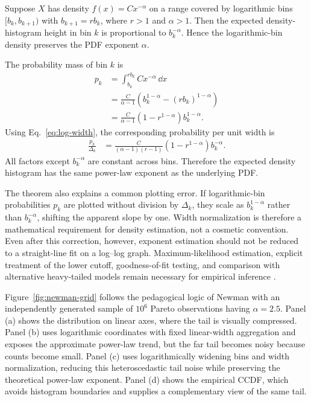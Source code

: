 \begin{theorem}
Suppose $X$ has density $f(x)=Cx^{-\alpha}$ on a range covered by logarithmic bins $[b_k,b_{k+1})$ with $b_{k+1}=rb_k$, where $r>1$ and $\alpha>1$. Then the expected density-histogram height in bin $k$ is proportional to $b_k^{-\alpha}$. Hence the logarithmic-bin density preserves the PDF exponent $\alpha$.
\end{theorem}

\begin{demonstration}
The probability mass of bin $k$ is
\begin{align}
 p_k
 &=\int_{b_k}^{rb_k}Cx^{-\alpha}\,\dd x\\
 &=\frac{C}{\alpha-1}
 \left(b_k^{1-\alpha}-(rb_k)^{1-\alpha}\right)\\
 &=\frac{C}{\alpha-1}
 \left(1-r^{1-\alpha}\right)b_k^{1-\alpha}.
\end{align}
Using Eq.~\eqref{eq:log-width}, the corresponding probability per unit width is
\begin{align}
 \frac{p_k}{\Delta_k}
 &=\frac{C}{(\alpha-1)(r-1)}
 \left(1-r^{1-\alpha}\right)b_k^{-\alpha}.
\end{align}
All factors except $b_k^{-\alpha}$ are constant across bins. Therefore the expected density histogram has the same power-law exponent as the underlying PDF.
\end{demonstration}

The theorem also explains a common plotting error. If logarithmic-bin probabilities $p_k$ are plotted without division by $\Delta_k$, they scale as $b_k^{1-\alpha}$ rather than $b_k^{-\alpha}$, shifting the apparent slope by one. Width normalization is therefore a mathematical requirement for density estimation, not a cosmetic convention. Even after this correction, however, exponent estimation should not be reduced to a straight-line fit on a log--log graph. Maximum-likelihood estimation, explicit treatment of the lower cutoff, goodness-of-fit testing, and comparison with alternative heavy-tailed models remain necessary for empirical inference \cite{ClausetShaliziNewman2009,VirkarClauset2014}.

Figure~\ref{fig:newman-grid} follows the pedagogical logic of Newman \cite{Newman2005} with an independently generated sample of $10^6$ Pareto observations having $\alpha=2.5$. Panel (a) shows the distribution on linear axes, where the tail is visually compressed. Panel (b) uses logarithmic coordinates with fixed linear-width aggregation and exposes the approximate power-law trend, but the far tail becomes noisy because counts become small. Panel (c) uses logarithmically widening bins and width normalization, reducing this heteroscedastic tail noise while preserving the theoretical power-law exponent. Panel (d) shows the empirical CCDF, which avoids histogram boundaries and supplies a complementary view of the same tail.

